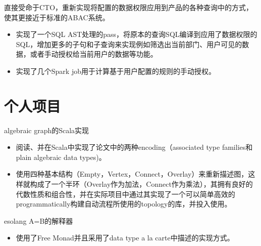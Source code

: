 \documentclass{resume}
\begin{document}
直接受命于CTO，重新实现将配置的数据权限应用到产品的各种查询中的方式，使其更接近于标准的ABAC系统。
\begin{itemize}[parsep=0.25ex]
\item 实现了一个SQL AST处理的pass，将原本的查询SQL编译到应用了数据权限的SQL，增加更多的子句和子查询来实现例如筛选出当前部门、用户可见的数据，或者手动授权给当前用户的数据等功能。
\item 实现了几个Spark job用于计算基于用户配置的规则的手动授权。
\end{itemize}
\section{个人项目}
algebraic graph的Scala实现
\begin{itemize}[parsep=0.25ex]
\item 阅读、并在Scala中实现了论文中的两种encoding（associated type families和plain algebraic data types)。
\item 使用四种基本结构（Empty，Vertex，Connect，Overlay）来重新描述图，这样就构成了一个半环（Overlay作为加法，Connect作为乘法），其拥有良好的代数性质和组合性，并在实际项目中通过其实现了一个可以简单高效的programmatically构建自动流程所使用的topology的库，并投入使用。
\end{itemize}
esolang A=B的解释器
\begin{itemize}[parsep=0.25ex]
\item 使用了Free Monad并且采用了data type a la carte中描述的实现方式。
\end{itemize}
\end{document}
